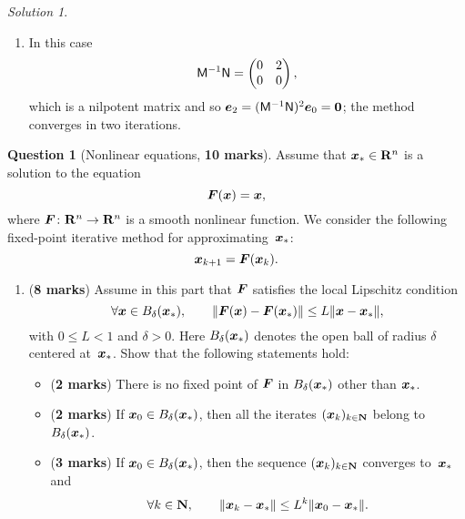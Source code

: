 \documentclass[11pt]{article}
\theoremstyle{definition}
\newtheorem{question}{Question}
\theoremstyle{remark}
\newtheorem*{solution}{Solution}
\begin{document}
\begin{solution}
\begin{enumerate}
        \item
            In this case
            \[
                \mathsf M^{-1} \mathsf N =
                \begin{pmatrix}
                    0 & 2 \\ 0 & 0
                \end{pmatrix},
            \]
            which is a nilpotent matrix and so $\mathbf{\boldsymbol{e}}_2 = (\mathsf M^{-1} \mathsf N)^2 \mathbf{\boldsymbol{e}}_0 = \mathbf{\boldsymbol{0}}$;
            the method converges in two iterations.
    \end{enumerate}
\end{solution}

\newpage
\begin{question}
    [Nonlinear equations, \textbf{10 marks}]
    Assume that $\mathbf{\boldsymbol{x}}_* \in \mathbf R^n$ is a solution to the equation
    \[
        \mathbf{\boldsymbol{F}}(\mathbf{\boldsymbol{x}}) = \mathbf{\boldsymbol{x}},
    \]
    where $\mathbf{\boldsymbol{F}}\colon \mathbf R^n \to \mathbf R^n$ is a smooth nonlinear function.
    We consider the following fixed-point iterative method for approximating~$\mathbf{\boldsymbol{x}}_*$:
    \begin{equation}
        \label{eq:fixed_point}
        \mathbf{\boldsymbol{x}}_{k+1} = \mathbf{\boldsymbol{F}}(\mathbf{\boldsymbol{x}}_k).
    \end{equation}
    \begin{enumerate}
        \item
            (\textbf{8 marks})
            Assume in this part that $\mathbf{\boldsymbol{F}}$ satisfies the local Lipschitz condition
            \begin{equation}
                \label{eq:local_lipschitz}
                \forall \vect x \in B_{\delta}(\vect x_*), \qquad
                \norm[big]{\vect F(\vect x) - \vect F(\vect x_*)} \leq L \norm{\vect x - \vect x_*},
            \end{equation}
            with $0 \leq L < 1$ and $\delta > 0$.
            Here $B_{\delta}(\mathbf{\boldsymbol{x}}_*)$ denotes the open ball of radius $\delta$ centered at~$\mathbf{\boldsymbol{x}}_*$.
            Show that the following statements hold:
            \begin{itemize}
                \item (\textbf{2 marks}) There is no fixed point of $\mathbf{\boldsymbol{F}}$ in $B_{\delta}(\mathbf{\boldsymbol{x}}_*)$ other than $\mathbf{\boldsymbol{x}}_*$.
                \item (\textbf{2 marks}) If $\mathbf{\boldsymbol{x}}_0 \in B_{\delta}(\mathbf{\boldsymbol{x}}_*)$, then all the iterates $(\mathbf{\boldsymbol{x}}_k)_{k \in \mathbf N}$ belong to $B_{\delta}(\mathbf{\boldsymbol{x}}_*)$.
                \item (\textbf{3 marks}) If $\mathbf{\boldsymbol{x}}_0 \in B_{\delta}(\mathbf{\boldsymbol{x}}_*)$, then the sequence $(\mathbf{\boldsymbol{x}}_k)_{k \in \mathbf N}$ converges to~$\mathbf{\boldsymbol{x}}_*$ and
                    \[
                        \forall k \in \mathbf N, \qquad
                        \lVert\mathbf{\boldsymbol{x}}_k - \mathbf{\boldsymbol{x}}_*\rVert \leq L^k \lVert\mathbf{\boldsymbol{x}}_0 - \mathbf{\boldsymbol{x}}_*\rVert.
                    \]
            \end{itemize}


\end{enumerate}
\end{question}
\end{document}
